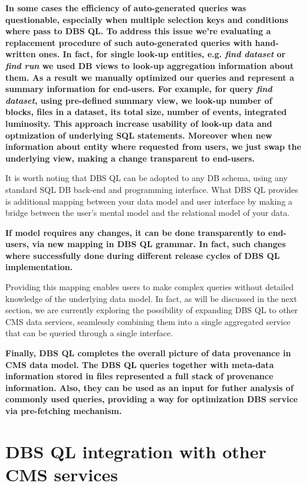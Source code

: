 \documentclass[a4paper]{jpconf}
\begin{document}
{\bf
In some cases the efficiency of auto-generated queries was questionable, especially
when multiple selection keys and conditions where pass to DBS QL. To address this
issue we're evaluating a replacement procedure of such auto-generated queries with
hand-written ones. In fact, for single look-up entities, e.g. {\it find dataset}
or {\it find run} we used DB views to look-up aggregation information
about them. As a result we manually optimized our queries and represent a
summary information for end-users. For example, for query {\it find dataset},
using pre-defined summary view, we look-up number of blocks, 
files in a dataset, its total size, number of events, integrated luminosity. 
This approach increase usability of look-up data and optmization of underlying
SQL statements. Moreover when new information about entity where requested from users,
we just swap the underlying view, making a change transparent to end-users.
}

It is worth noting that DBS QL can be adopted to
any DB schema, using any standard SQL DB back-end and programming interface.
What DBS QL provides is additional mapping between your data model and
user interface by making a bridge between the user's mental model
and the relational model of your data. 

{\bf
If model requires any changes, it can be done
transparently to end-users, via new mapping in DBS QL grammar. In fact,
such changes where successfully done during different release cycles of
DBS QL implementation.
}

Providing this mapping enables
users to make complex queries without detailed knowledge of
the underlying data model. 
In fact, as will be discussed in the
next section, we are currently exploring the possibility of
expanding DBS QL to other CMS data services, seamlessly combining them
into a single aggregated service that can be queried through a single interface.

{\bf
Finally, DBS QL completes the overall picture of data provenance in CMS data model.
The DBS QL queries together with meta-data information stored in files represented
a full stack of provenance information. Also, they can be used
as an input for futher analysis of commonly used queries, providing a way for
optimization DBS service via pre-fetching mechanism.
}

\section{DBS QL integration with other CMS services}
\end{document}
